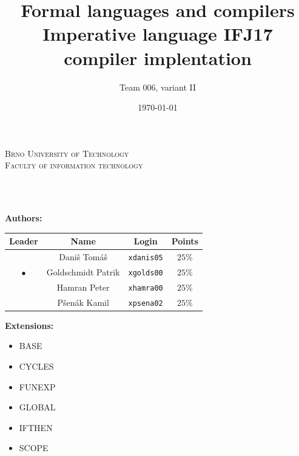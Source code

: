\documentclass[a4paper, 11pt]{article}
\title
{	
	{\Huge Formal languages and compilers} \\[1em]
	{\huge Imperative language IFJ17 compiler implentation}
}
\author{\LARGE Team 006, variant II}
\date{\Large \today}
\begin{document}
\makeatletter
\begin{titlepage}
	
	\begin{center}
	{\Huge
		\textsc{Brno University of Technology}} \\[3.5mm]
	{\huge \textsc{Faculty of information technology}} \\

	
	\@title \\[1.1em]
	\@author \\[1.2em]
	\@date
	
	\end{center}
	
	\vspace{\fill}

	\begin{minipage}[t]{0.77\textwidth}
	\vspace{\fill}
	\bigskip
	\medskip
	{\Large \textbf{Authors:}}	\\[1.2em]
	\begin{tabular}{| c| c | c | c |}
	\hline
	Leader 		& Name	 			& Login	 			& Points \\ \hline
				& Daniš Tomáš 		& \texttt{xdanis05} 	& $25 \%$		\\ \hline
	$\bullet$		& Goldschmidt Patrik	& \texttt{xgolds00}	& $25 \%$		\\ \hline
				& Hamran Peter		& \texttt{xhamra00}	& $25 \%$		\\ \hline
				& Pšenák Kamil		& \texttt{xpsena02}	& $25 \%$		\\ \hline
	\end{tabular}
	
	
	\end{minipage}
	\begin{minipage}[t]{0.28\textwidth}
	
	\hspace{4.55mm}	{\Large \textbf{Extensions:}}
	\begin{itemize}
		\item BASE
		\item CYCLES
		\item FUNEXP
		\item GLOBAL
		\item IFTHEN
		\item SCOPE
	\end{itemize}
	\end{minipage}
\end{titlepage}
\end{document}
